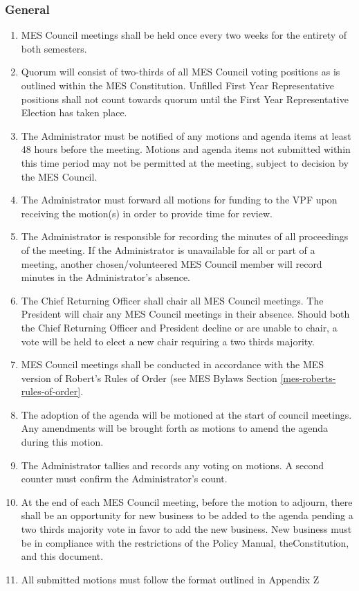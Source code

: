 \subsubsection{General}
\label{meetings-general}

\begin{enumerate}
 \item
  MES Council meetings shall be held once every two weeks for the
  entirety of both semesters.
 \item
  Quorum will consist of two-thirds of all MES Council voting positions
  as is outlined within the MES Constitution. Unfilled First Year
  Representative positions shall not count towards quorum until the
  First Year Representative Election has taken place.
 \item
  The Administrator must be notified of any motions and agenda items at
  least 48 hours before the meeting. Motions and agenda items not
  submitted within this time period may not be permitted at the meeting,
  subject to decision by the MES Council.
 \item
  The Administrator must forward all motions for funding to the VPF upon
  receiving the motion(s) in order to provide time for review.
 \item
  The Administrator is responsible for recording the minutes of all
  proceedings of the meeting. If the Administrator is unavailable for
  all or part of a meeting, another chosen/volunteered MES Council
  member will record minutes in the Administrator's absence.
 \item \label{CRO-chair-meetings}
  The Chief Returning Officer shall chair all MES Council meetings. The
  President will chair any MES Council meetings in their absence. Should
  both the Chief Returning Officer and President decline or are unable
  to chair, a vote will be held to elect a new chair requiring a two
  thirds majority.
 \item
  MES Council meetings shall be conducted in accordance with the MES
  version of Robert's Rules of Order (see MES Bylaws Section \ref{mes-roberts-rules-of-order}.
 \item
  The adoption of the agenda will be motioned at the start of council
  meetings. Any amendments will be brought forth as motions to amend the
  agenda during this motion.
 \item
  The Administrator tallies and records any voting on motions. A second
  counter must confirm the Administrator's count.
 \item
  At the end of each MES Council meeting, before the motion to adjourn,
  there shall be an opportunity for new business to be added to the
  agenda pending a two thirds majority vote in favor to add the new
  business. New business must be in compliance with the restrictions of
  the Policy Manual, theConstitution, and this document. %
 \item
  All submitted motions must follow the format outlined in Appendix Z %

\end{enumerate}

